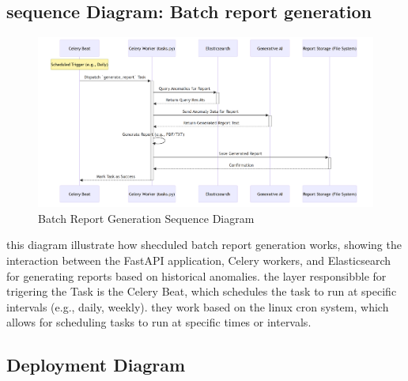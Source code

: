 



\subsection{sequence Diagram: Batch report generation}
\begin{figure}[H]
    
    \includegraphics[width=1.2\textwidth]{figures/batch-1.png}
    \caption{Batch Report Generation Sequence Diagram}
    \label{fig:batch_report_generation_sequence_diagram}


\end{figure}


this diagram illustrate how shecduled batch report generation works, showing the interaction between the FastAPI application, Celery workers, and Elasticsearch for generating reports based on historical anomalies.
the layer responsibble for trigering the Task is the Celery Beat, which schedules the task to run at specific intervals (e.g., daily, weekly).
they work based on the linux cron system, which allows for scheduling tasks to run at specific times or intervals.




\subsection{Deployment Diagram}

